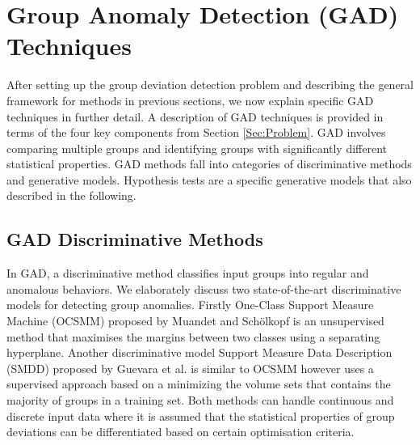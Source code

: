 \section{Group Anomaly Detection (GAD) Techniques} \label{Sec:D}
After setting up the group deviation detection  problem and describing the general framework for methods in previous sections, we now  explain specific GAD techniques in further detail. A description of GAD techniques is provided in terms of the four key components from Section   \ref{Sec:Problem}.  GAD involves comparing multiple groups and identifying groups with significantly different statistical properties.   GAD methods fall into  categories of discriminative methods and generative models. Hypothesis tests are a specific generative models that also described in the following.  



\subsection{ GAD Discriminative Methods } 
 In GAD, a discriminative method classifies input groups into regular and anomalous behaviors.  
We  elaborately discuss two state-of-the-art discriminative models for detecting group anomalies.  Firstly One-Class Support Measure Machine (OCSMM)   proposed by Muandet and Sch\"olkopf \cite{OCSMM} %
is an unsupervised method that maximises the margins between two classes using a separating hyperplane.  
 Another discriminative model Support Measure Data Description (SMDD)   proposed by Guevara et al. \cite{SMDD} is similar to OCSMM however uses a supervised approach  based on a minimizing the  volume sets that contains the majority of groups in a training set.  %
  Both methods can handle continuous and discrete input data where it is assumed that the statistical properties of group deviations can be differentiated based on certain  optimisation criteria. 
  
